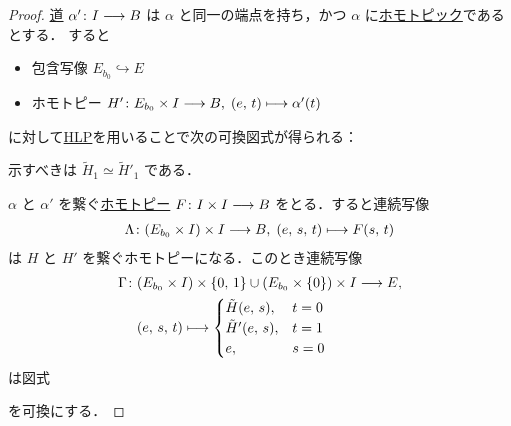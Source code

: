 \documentclass[algtopo_main]{subfiles}
\begin{document}
\begin{proof}
    \hyperref[def:path-basic]{道} $\alpha' \colon I \longrightarrow B$ は $\alpha$ と同一の端点を持ち，かつ $\alpha$ に\hyperref[def:homotopy-basic]{ホモトピック}であるとする．
    すると
    \begin{itemize}
        \item 包含写像 $E_{b_0} \hookrightarrow E$
        \item ホモトピー $H' \colon E_{b_0} \times I \longrightarrow B,\; (e,\, t) \longmapsto \alpha'(t)$
    \end{itemize}
    に対して\hyperref[def:HLP]{HLP}を用いることで次の可換図式が得られる：
    \begin{center}
    \end{center}
    示すべきは $\tilde{H}_1 \simeq \tilde{H}'_1$ である．

    $\alpha$ と $\alpha'$ を繋ぐ\hyperref[def:homotopy-basic]{ホモトピー} $F \colon I \times I \longrightarrow B$ をとる．すると連続写像
    \begin{align}
        \Lambda \colon (E_{b_0} \times I) \times I \longrightarrow B,\; (e,\, s,\, t) \longmapsto F(s,\, t)
    \end{align}
    は $H$ と $H'$ を繋ぐホモトピーになる．このとき連続写像
    \begin{align}
        \Gamma \colon &(E_{b_0} \times I ) \times \{0,\, 1\} \cup (E_{b_0} \times \{0\}) \times I \longrightarrow E, \\
        &(e,\, s,\, t) \longmapsto 
        \begin{cases}
            \tilde{H} (e,\, s), & t=0 \\
            \tilde{H}' (e,\, s), & t=1 \\
            e, & s=0
        \end{cases}
    \end{align}
    は図式
    \begin{center}
    \end{center}
    を可換にする．
    

\end{proof}
\end{document}
